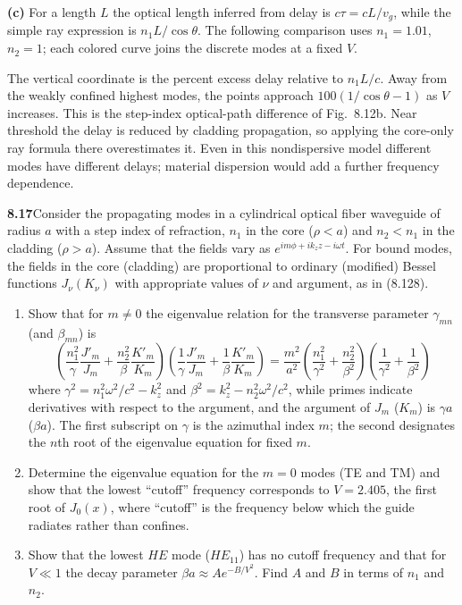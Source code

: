 \medskip\noindent\textbf{(c)} For a length $L$ the optical length inferred from delay is
$c\tau=cL/v_g$, while the simple ray expression is
$n_1L/\cos\theta$.  The following comparison uses $n_1=1.01$,
$n_2=1$; each colored curve joins the discrete modes at a fixed $V$.
\begin{center}\end{center}
The vertical coordinate is the percent excess delay relative to
$n_1L/c$.  Away from the weakly confined highest modes, the points
approach $100(1/\cos\theta-1)$ as $V$ increases.  This is the
step-index optical-path difference of Fig.~8.12b.  Near threshold
the delay is reduced by cladding propagation, so applying the
core-only ray formula there overestimates it.  Even in this
nondispersive model different modes have different delays; material
dispersion would add a further frequency dependence.

\par\bigskip
\noindent\textbf{8.17}\quad Consider the propagating modes in a cylindrical optical fiber waveguide of radius $a$ with a step index of refraction, $n_{1}$ in the core ($\rho<a$) and $n_{2}<n_{1}$ in the cladding ($\rho>a$). Assume that the fields vary as $e^{im\phi+ik_{z}z-i\omega t}$. For bound modes, the fields in the core (cladding) are proportional to ordinary (modified) Bessel functions $J_{\nu}(K_{\nu})$ with appropriate values of $\nu$ and argument, as in (8.128).
\begin{enumerate}
\item[(a)] Show that for $m\neq0$ the eigenvalue relation for the transverse parameter $\gamma_{mn}$ (and $\beta_{mn}$) is
\[
\left(\frac{n_{1}^{2}}{\gamma}\frac{J'_{m}}{J_{m}}+\frac{n_{2}^{2}}{\beta}\frac{K'_{m}}{K_{m}}\right)\!\left(\frac{1}{\gamma}\frac{J'_{m}}{J_{m}}+\frac{1}{\beta}\frac{K'_{m}}{K_{m}}\right)
=\frac{m^{2}}{a^{2}}\left(\frac{n_{1}^{2}}{\gamma^{2}}+\frac{n_{2}^{2}}{\beta^{2}}\right)\!\left(\frac{1}{\gamma^{2}}+\frac{1}{\beta^{2}}\right)
\]
where $\gamma^{2}=n_{1}^{2}\omega^{2}/c^{2}-k_{z}^{2}$ and $\beta^{2}=k_{z}^{2}-n_{2}^{2}\omega^{2}/c^{2}$, while primes indicate derivatives with respect to the argument, and the argument of $J_{m}$ ($K_{m}$) is $\gamma a$ ($\beta a$). The first subscript on $\gamma$ is the azimuthal index $m$; the second designates the $n$th root of the eigenvalue equation for fixed $m$.
\item[(b)] Determine the eigenvalue equation for the $m=0$ modes (TE and TM) and show that the lowest ``cutoff'' frequency corresponds to $V=2.405$, the first root of $J_{0}(x)$, where ``cutoff'' is the frequency below which the guide radiates rather than confines.
\item[(c)] Show that the lowest $HE$ mode ($HE_{11}$) has no cutoff frequency and that for $V\ll1$ the decay parameter $\beta a\approx Ae^{-B/V^{2}}$. Find $A$ and $B$ in terms of $n_{1}$ and $n_{2}$.
\end{enumerate}
\solution

